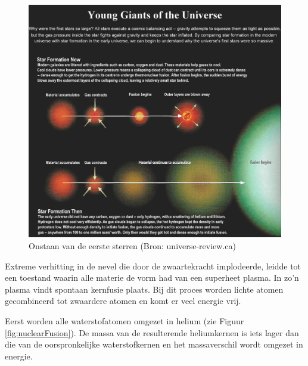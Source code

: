 \documentclass[
  11pt,
]{book}
\begin{document}
\begin{figure}

{\centering \includegraphics[width=1\linewidth]{./figs/I08-13-firststars6} 

}

\caption{Onstaan van de eerste sterren (Bron: universe-review.ca)}\label{fig:genesisStar}
\end{figure}

Extreme verhitting in de nevel die door de zwaartekracht implodeerde, leidde tot een toestand waarin alle materie de vorm had van een superheet plasma. In zo'n plasma vindt spontaan kernfusie plaats. Bij dit proces worden lichte atomen gecombineerd tot zwaardere atomen en komt er veel energie vrij.

Eerst worden alle waterstofatomen omgezet in helium (zie Figuur \ref{fig:nuclearFusion}). De massa van de resulterende heliumkernen is iets lager dan die van de oorspronkelijke waterstofkernen en het massaverschil wordt omgezet in energie.
\end{document}
